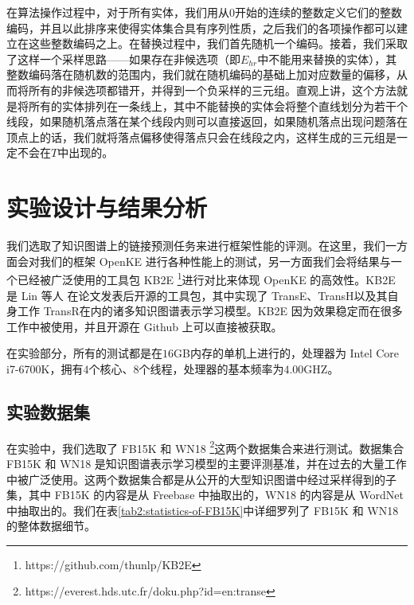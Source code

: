 在算法操作过程中，对于所有实体，我们用从$0$开始的连续的整数定义它们的整数编码，并且以此排序来使得实体集合具有序列性质，之后我们的各项操作都可以建立在这些整数编码之上。在替换过程中，我们首先随机一个编码。接着，我们采取了这样一个采样思路——如果存在非候选项（即$E_{hr}$中不能用来替换的实体），其整数编码落在随机数的范围内，我们就在随机编码的基础上加对应数量的偏移，从而将所有的非候选项都错开，并得到一个负采样的三元组。直观上讲，这个方法就是将所有的实体排列在一条线上，其中不能替换的实体会将整个直线划分为若干个线段，如果随机落点落在某个线段内则可以直接返回，如果随机落点出现问题落在顶点上的话，我们就将落点偏移使得落点只会在线段之内，这样生成的三元组是一定不会在$T$中出现的。

\section{实验设计与结果分析}

我们选取了知识图谱上的链接预测任务来进行框架性能的评测。在这里，我们一方面会对我们的框架 OpenKE 进行各种性能上的测试，另一方面我们会将结果与一个已经被广泛使用的工具包 KB2E \footnote{https://github.com/thunlp/KB2E}进行对比来体现 OpenKE 的高效性。KB2E 是 Lin 等人\cite{lin2015learning} 在论文发表后开源的工具包，其中实现了 TransE、TransH以及其自身工作 TransR在内的诸多知识图谱表示学习模型。KB2E 因为效果稳定而在很多工作中被使用，并且开源在 Github 上可以直接被获取。

在实验部分，所有的测试都是在$16$GB内存的单机上进行的，处理器为 Intel Core i7-6700K，拥有$4$个核心、$8$个线程，处理器的基本频率为$4.00$GHZ。

\subsection{实验数据集}

在实验中，我们选取了 FB15K 和 WN18 \footnote{https://everest.hds.utc.fr/doku.php?id=en:transe}这两个数据集合来进行测试。数据集合 FB15K 和 WN18 是知识图谱表示学习模型的主要评测基准，并在过去的大量工作中被广泛使用。这两个数据集合都是从公开的大型知识图谱中经过采样得到的子集，其中 FB15K 的内容是从 Freebase 中抽取出的，WN18 的内容是从 WordNet 中抽取出的。我们在表\ref{tab2:statistics-of-FB15K}中详细罗列了 FB15K 和 WN18 的整体数据细节。

\vspace{25pt}
\begin{table}[htb]
\setlength{\abovecaptionskip}{30pt} 
\centering
\caption{FB15K 和 WN18 的数据细节}
\label{tab2:statistics-of-FB15K}
\end{table}

